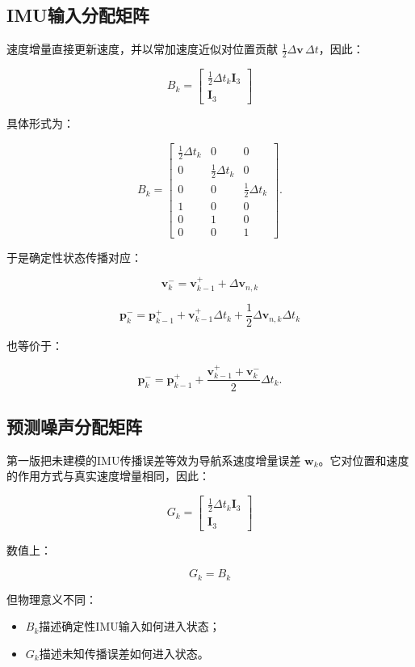 \documentclass[12pt,a4paper]{ctexart}
\newcommand{\I}{\mathbf I}
\begin{document}
\subsection{IMU输入分配矩阵}

速度增量直接更新速度，并以常加速度近似对位置贡献
$\frac{1}{2}\Delta\mathbf v\,\Delta t$，因此：

\[
\boxed{
B_k =
\begin{bmatrix}
\frac{1}{2}\Delta t_k\I_3\\
\I_3
\end{bmatrix}
}
\]

具体形式为：

\[
B_k =
\begin{bmatrix}
\frac{1}{2}\Delta t_k&0&0\\
0&\frac{1}{2}\Delta t_k&0\\
0&0&\frac{1}{2}\Delta t_k\\
1&0&0\\
0&1&0\\
0&0&1
\end{bmatrix}.
\]

于是确定性状态传播对应：

\[
\boxed{
\mathbf v_k^- =
\mathbf v_{k-1}^+
+
\Delta\mathbf v_{n,k}
}
\]

\[
\boxed{
\mathbf p_k^- =
\mathbf p_{k-1}^+
+
\mathbf v_{k-1}^+\Delta t_k
+
\frac{1}{2}\Delta\mathbf v_{n,k}\Delta t_k
}
\]

也等价于：

\[
\mathbf p_k^- =
\mathbf p_{k-1}^+
+
\frac{\mathbf v_{k-1}^+ + \mathbf v_k^-}{2}\Delta t_k.
\]

\subsection{预测噪声分配矩阵}

第一版把未建模的IMU传播误差等效为导航系速度增量误差
$\mathbf w_k$。它对位置和速度的作用方式与真实速度增量相同，因此：

\[
\boxed{
G_k =
\begin{bmatrix}
\frac{1}{2}\Delta t_k\I_3\\
\I_3
\end{bmatrix}
}
\]

数值上：

\[
\boxed{G_k=B_k}
\]

但物理意义不同：

\begin{itemize}[leftmargin=2em]
  \item $B_k$描述确定性IMU输入如何进入状态；
  \item $G_k$描述未知传播误差如何进入状态。
\end{itemize}
\end{document}
